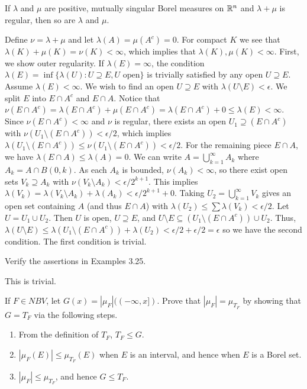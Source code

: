 \documentclass[12pt,a4paper]{article}
\begin{document}
\begin{problem}\label{prob:3-26}
If $\lambda$ and $\mu$ are positive, mutually singular Borel measures on $\mathbb{R}^{n}$ and $\lambda+\mu$ is regular, then so are $\lambda$ and $\mu$.
\end{problem}
\begin{solution}
Define $\nu=\lambda+\mu$ and let $\lambda(A)=\mu(A^c)=0$. 
For compact $K$ we see that $\lambda(K)+\mu(K)=\nu(K)<\infty$, which implies that $\lambda(K),\mu(K)<\infty$. 
First, we show outer regularity. 
If $\lambda(E) = \infty$, the condition $\lambda(E) = \inf\{\lambda(U) : U \supseteq E, U \text{ open}\}$ is trivially satisfied by any open $U \supseteq E$. 
Assume $\lambda(E) < \infty$. 
We wish to find an open $U \supseteq E$ with $\lambda(U \setminus E) < \epsilon$. 
We split $E$ into $E \cap A^c$ and $E \cap A$. 
Notice that $\nu(E \cap A^c) = \lambda(E \cap A^c) + \mu(E \cap A^c) = \lambda(E \cap A^c) + 0 \le \lambda(E) < \infty$. 
Since $\nu(E \cap A^c) < \infty$ and $\nu$ is regular, there exists an open $U_1 \supseteq (E \cap A^c)$ with $\nu(U_1 \setminus (E \cap A^c)) < \epsilon/2$, which implies $\lambda(U_1 \setminus (E \cap A^c))\leq\nu(U_1\setminus(E\cap A^c))< \epsilon/2$. 
For the remaining piece $E \cap A$, we have $\lambda(E \cap A) \le \lambda(A) = 0$. 
We can write $A = \bigcup_{k=1}^\infty A_k$ where $A_k = A \cap B(0,k)$. 
As each $A_k$ is bounded, $\nu(A_k) < \infty$, so there exist open sets $V_k \supseteq A_k$ with $\nu(V_k \setminus A_k) < \epsilon/2^{k+1}$. 
This implies $\lambda(V_k) = \lambda(V_k \setminus A_k) + \lambda(A_k) < \epsilon/2^{k+1} + 0$. 
Taking $U_2 = \bigcup_{k=1}^\infty V_k$ gives an open set containing $A$ (and thus $E \cap A$) with $\lambda(U_2) \le \sum \lambda(V_k) < \epsilon/2$. 
Let $U = U_1 \cup U_2$. 
Then $U$ is open, $U \supseteq E$, and $U \setminus E \subseteq (U_1 \setminus (E \cap A^c)) \cup U_2$. 
Thus, $\lambda(U \setminus E) \le \lambda(U_1 \setminus (E \cap A^c)) + \lambda(U_2) < \epsilon/2 + \epsilon/2 = \epsilon$ so we have the second condition. 
The first condition is trivial.
\end{solution}
\begin{problem}\label{prob:3-27}
Verify the assertions in Examples 3.25.
\end{problem}
\begin{solution}
This is trivial.
\end{solution}
\begin{problem}\label{prob:3-28}
If $F\in NBV$, let $G(x)=|\mu_{F}|((-\infty,x])$. Prove that  $|\mu_{F}|=\mu_{T_{F}}$ by showing that $G=T_{F}$ via the following steps.
\begin{enumerate}[label=\alph*.]
	\item From the definition of $T_{F}$, $T_{F}\le G$.
	\item $|\mu_{F}(E)|\le\mu_{T_{F}}(E)$ when $E$ is an interval, and hence when $E$ is a Borel set.
    \item $|\mu_{F}|\le\mu_{T_{F}}$, and hence $G\le T_{F}$.
\end{enumerate}
\end{problem}
\end{document}
